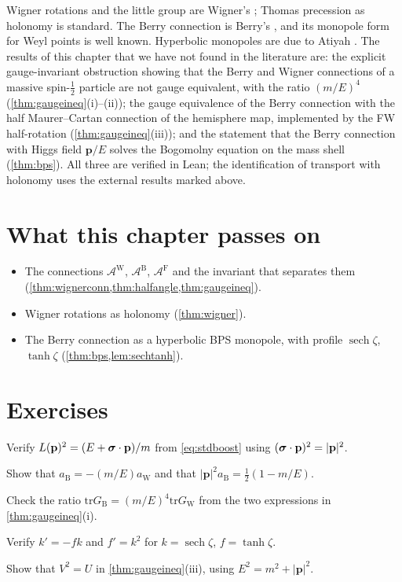 \begin{litbox}
Wigner rotations and the little group are Wigner's \cite{Wigner1939}; Thomas precession as holonomy is standard. The Berry connection is Berry's \cite{Berry1984}, and its monopole form for Weyl points is well known. Hyperbolic monopoles are due to Atiyah \cite{Atiyah1984}. The results of this chapter that we have not found in the literature are: the explicit gauge-invariant obstruction showing that the Berry and Wigner connections of a massive spin-$\frac12$ particle are not gauge equivalent, with the ratio $(m/E)^4$ (\cref{thm:gaugeineq}(i)--(ii)); the gauge equivalence of the Berry connection with the half Maurer--Cartan connection of the hemisphere map, implemented by the FW half-rotation (\cref{thm:gaugeineq}(iii)); and the statement that the Berry connection with Higgs field $\mathbf p/E$ solves the Bogomolny equation on the mass shell (\cref{thm:bps}). All three are verified in Lean; the identification of transport with holonomy uses the external results marked above.
\end{litbox}

\section*{What this chapter passes on}
\begin{itemize}[nosep]
\item The connections $\mathcal A^{\mathrm W}$, $\mathcal A^{\mathrm B}$, $\mathcal A^{\mathrm F}$ and the invariant that separates them (\cref{thm:wignerconn,thm:halfangle,thm:gaugeineq}).
\item Wigner rotations as holonomy (\cref{thm:wigner}).
\item The Berry connection as a hyperbolic BPS monopole, with profile $\operatorname{sech}\zeta$, $\tanh\zeta$ (\cref{thm:bps,lem:sechtanh}).
\end{itemize}

\section*{Exercises}
\begin{exercise}
Verify $L(\mathbf p)^2=(E+\boldsymbol{\sigma}\cdot\mathbf p)/m$ from \eqref{eq:stdboost} using $(\boldsymbol{\sigma}\cdot\mathbf p)^2=|\mathbf p|^2$.
\end{exercise}
\begin{exercise}
Show that $a_{\mathrm B}=-(m/E)a_{\mathrm W}$ and that $|\mathbf p|^2a_{\mathrm B}=\frac12(1-m/E)$.
\end{exercise}
\begin{exercise}
Check the ratio $\mathrm{tr}G_{\mathrm B}=(m/E)^4\mathrm{tr}G_{\mathrm W}$ from the two expressions in \cref{thm:gaugeineq}(i).
\end{exercise}
\begin{exercise}
Verify $k'=-fk$ and $f'=k^2$ for $k=\operatorname{sech}\zeta$, $f=\tanh\zeta$.
\end{exercise}
\begin{exercise}
Show that $V^2=U$ in \cref{thm:gaugeineq}(iii), using $E^2=m^2+|\mathbf p|^2$.
\end{exercise}

